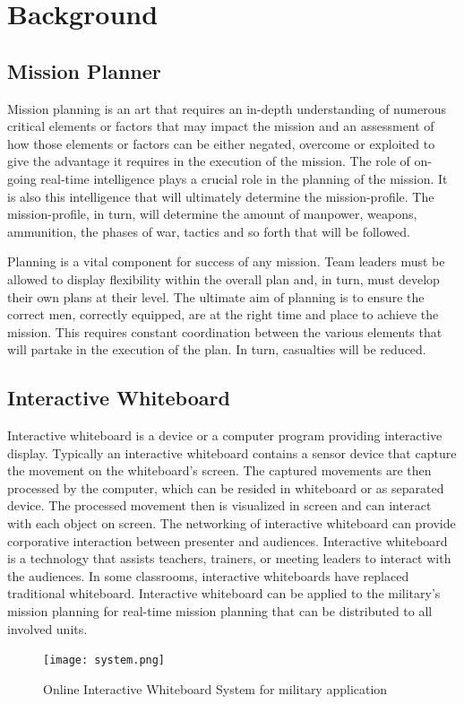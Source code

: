 \documentclass[conference]{IEEEtran}
\begin{document}
\section{Background}
\subsection{Mission Planner}
Mission planning is an art that requires an in-depth understanding of numerous critical elements or factors that may impact the mission and an assessment of how those elements or factors can be either negated, overcome or exploited to give the advantage it requires in the execution of the mission. The role of on-going real-time intelligence plays a crucial role in the planning of the mission. It is also this intelligence that will ultimately determine the mission-profile. The mission-profile, in turn, will determine the amount of manpower, weapons, ammunition, the phases of war, tactics and so forth that will be followed. \cite{AB}

Planning is a vital component for success of any mission. Team leaders must be allowed to display flexibility within the overall plan and, in turn, must develop their own plans at their level. The ultimate aim of planning is to ensure the correct men, correctly equipped, are at the right time and place to achieve the mission. This requires constant coordination between the various elements that will partake in the execution of the plan. In turn, casualties will be reduced.  
\subsection{Interactive Whiteboard}
Interactive whiteboard is a device or a computer program providing interactive display. Typically an interactive whiteboard contains a sensor device that capture the movement on the whiteboard’s screen. The captured movements are then processed by the computer, which can be resided in whiteboard or as separated device. The processed movement then is visualized in screen and can interact with each object on screen. The networking of interactive whiteboard can provide corporative interaction between presenter and audiences. Interactive whiteboard is a technology that assists teachers, trainers, or meeting leaders to interact with the audiences. In some classrooms, interactive whiteboards have replaced traditional whiteboard. Interactive whiteboard can be applied to the military's mission planning for real-time mission planning that can be distributed to all involved units.
\begin{figure}[t]
\begin{center}
\texttt{[image: system.png]}
\caption{Online Interactive Whiteboard System for military application}
\label{fig:1}
\end{center}
\end{figure}
\end{document}
